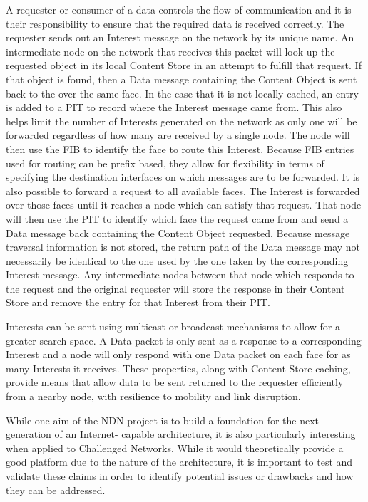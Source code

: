 \documentclass[a4paper,12pt]{report}      %
\begin{document}
A requester or consumer of a data controls the flow of communication and it is their responsibility to
ensure that the required data is received correctly. The requester sends out an Interest message on the
network by its unique name. An intermediate node on the network that receives this packet will look
up the requested object in its local Content Store in an attempt to fulfill that request. If that object is
found, then a Data message containing the Content Object is sent back to the over the same face. In the
case that it is not locally cached, an entry is added to a PIT to record where the Interest message came
from. This also helps limit the number of Interests generated on the network as only one will be
forwarded regardless of how many are received by a single node. The node will then use the FIB to
identify the face to route this Interest. Because FIB entries used for routing
can be prefix based, they allow for flexibility in terms of specifying the destination interfaces on which 
messages are to be forwarded. It is also possible to forward a request to all available faces. 
The Interest is forwarded over those faces until it reaches a node which can satisfy that request. 
That node will then use the PIT to identify which face the request came from and send a Data message
 back containing the Content Object requested. Because message traversal information is not stored, 
the return path of the Data message may not necessarily be identical to the one used by the one taken by the corresponding Interest message.
Any intermediate nodes between that node which responds to the request and the original requester will
store the response in their Content Store and remove the entry for that Interest from their PIT\cite{nnc}. 

Interests can be sent using multicast or broadcast mechanisms to allow for a greater search
space. A Data packet is only sent as a response to a corresponding Interest and a node will only respond
with one Data packet on each face for as many Interests it receives. These properties, along with
Content Store caching, provide means that allow data to be sent returned to the requester efficiently
from a nearby node, with resilience to mobility and link disruption.

While one aim of the NDN project is to build a foundation for the next generation of an Internet-
capable architecture, it is also particularly interesting when applied to Challenged Networks. While it
would theoretically provide a good platform due to the nature of the architecture, it is important to test
and validate these claims in order to identify potential issues or drawbacks and how they can be
addressed\cite{ndnproj}.
\end{document}
